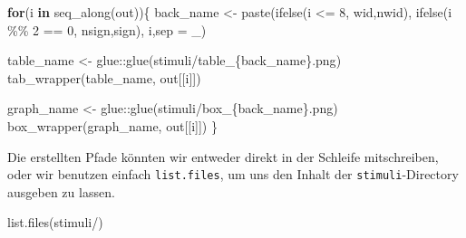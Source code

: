 \documentclass[
]{book}
\newenvironment{Shaded}{\begin{snugshade}}{\end{snugshade}}
\newcommand{\AttributeTok}[1]{\textcolor[rgb]{0.77,0.63,0.00}{#1}}
\newcommand{\ControlFlowTok}[1]{\textcolor[rgb]{0.13,0.29,0.53}{\textbf{#1}}}
\newcommand{\DecValTok}[1]{\textcolor[rgb]{0.00,0.00,0.81}{#1}}
\newcommand{\FunctionTok}[1]{\textcolor[rgb]{0.00,0.00,0.00}{#1}}
\newcommand{\NormalTok}[1]{#1}
\newcommand{\OtherTok}[1]{\textcolor[rgb]{0.56,0.35,0.01}{#1}}
\newcommand{\SpecialCharTok}[1]{\textcolor[rgb]{0.00,0.00,0.00}{#1}}
\newcommand{\StringTok}[1]{\textcolor[rgb]{0.31,0.60,0.02}{#1}}
\begin{document}
\begin{Shaded}
\begin{Highlighting}[]
\ControlFlowTok{for}\NormalTok{(i }\ControlFlowTok{in} \FunctionTok{seq\_along}\NormalTok{(out))\{}
\NormalTok{  back\_name }\OtherTok{\textless{}{-}} \FunctionTok{paste}\NormalTok{(}\FunctionTok{ifelse}\NormalTok{(i }\SpecialCharTok{\textless{}=} \DecValTok{8}\NormalTok{, }\StringTok{\textquotesingle{}wid\textquotesingle{}}\NormalTok{,}\StringTok{\textquotesingle{}nwid\textquotesingle{}}\NormalTok{),}
                     \FunctionTok{ifelse}\NormalTok{(i }\SpecialCharTok{\%\%} \DecValTok{2} \SpecialCharTok{==} \DecValTok{0}\NormalTok{, }\StringTok{\textquotesingle{}nsign\textquotesingle{}}\NormalTok{,}\StringTok{\textquotesingle{}sign\textquotesingle{}}\NormalTok{),}
\NormalTok{                     i,}\AttributeTok{sep =} \StringTok{\textquotesingle{}\_\textquotesingle{}}\NormalTok{)}
  
\NormalTok{  table\_name }\OtherTok{\textless{}{-}}\NormalTok{ glue}\SpecialCharTok{::}\FunctionTok{glue}\NormalTok{(}\StringTok{\textquotesingle{}stimuli/table\_\{back\_name\}.png\textquotesingle{}}\NormalTok{)}
  \FunctionTok{tab\_wrapper}\NormalTok{(table\_name, out[[i]])}
  
\NormalTok{  graph\_name }\OtherTok{\textless{}{-}}\NormalTok{ glue}\SpecialCharTok{::}\FunctionTok{glue}\NormalTok{(}\StringTok{\textquotesingle{}stimuli/box\_\{back\_name\}.png\textquotesingle{}}\NormalTok{)}
  \FunctionTok{box\_wrapper}\NormalTok{(graph\_name, out[[i]])}
\NormalTok{\}}
\end{Highlighting}
\end{Shaded}

Die erstellten Pfade könnten wir entweder direkt in der Schleife mitschreiben, oder wir benutzen einfach \texttt{list.files}, um uns den Inhalt der \texttt{stimuli}-Directory ausgeben zu lassen.

\begin{Shaded}
\begin{Highlighting}[]
\FunctionTok{list.files}\NormalTok{(}\StringTok{\textquotesingle{}stimuli/\textquotesingle{}}\NormalTok{)}
\end{Highlighting}
\end{Shaded}
\end{document}
